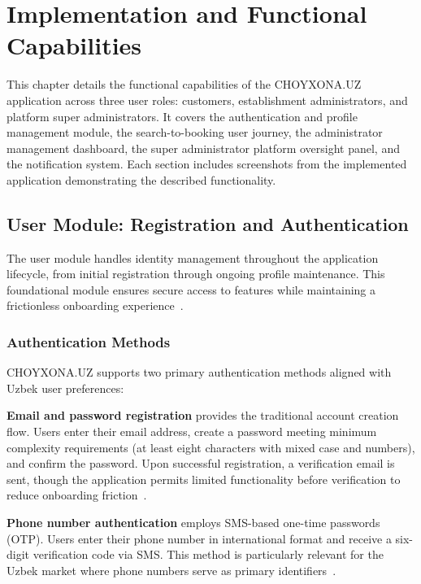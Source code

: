 \chapter{Implementation and Functional Capabilities}
\label{ch:implementation}

This chapter details the functional capabilities of the CHOYXONA.UZ application across three user roles: customers, establishment administrators, and platform super administrators.
It covers the authentication and profile management module, the search-to-booking user journey, the administrator management dashboard, the super administrator platform oversight panel, and the notification system.
Each section includes screenshots from the implemented application demonstrating the described functionality.


\section{User Module: Registration and Authentication}
\label{sec:user-module}

The user module handles identity management throughout the application lifecycle, from initial registration through ongoing profile maintenance.
This foundational module ensures secure access to features while maintaining a frictionless onboarding experience~\cite{firebase_auth2024}.

\subsection{Authentication Methods}
\label{subsec:auth-methods}

CHOYXONA.UZ supports two primary authentication methods aligned with Uzbek user preferences:

\textbf{Email and password registration} provides the traditional account creation flow.
Users enter their email address, create a password meeting minimum complexity requirements (at least eight characters with mixed case and numbers), and confirm the password.
Upon successful registration, a verification email is sent, though the application permits limited functionality before verification to reduce onboarding friction~\cite{firebase_auth2024}.

\textbf{Phone number authentication} employs SMS-based one-time passwords (OTP).
Users enter their phone number in international format and receive a six-digit verification code via SMS.
This method is particularly relevant for the Uzbek market where phone numbers serve as primary identifiers~\cite{khawas2018}.

